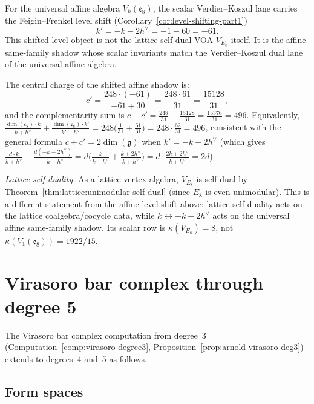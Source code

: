 \begin{computation}
\label{comp:E8-koszul-dual}
For the universal affine algebra $V_k(\mathfrak e_8)$, the scalar
Verdier--Koszul lane carries the Feigin--Frenkel level shift
(Corollary~\ref{cor:level-shifting-part1})
\[
k' = -k - 2h^\vee = -1 - 60 = -61.
\]
This shifted-level object is not the lattice self-dual VOA
$V_{E_8}$ itself. It is the affine same-family shadow whose scalar
invariants match the Verdier--Koszul dual lane of the universal
affine algebra.

The central charge of the shifted affine shadow is:
\[
c' = \frac{248 \cdot (-61)}{-61 + 30} = \frac{248 \cdot 61}{31} = \frac{15128}{31},
\]
and the complementarity sum is
$c + c' = \frac{248}{31} + \frac{15128}{31} = \frac{15376}{31} = 496$.
Equivalently,
$\frac{\dim(\mathfrak{e}_8) \cdot k}{k+h^\vee} +
\frac{\dim(\mathfrak{e}_8) \cdot k'}{k'+h^\vee}
= 248\bigl(\tfrac{1}{31} + \tfrac{61}{31}\bigr)
= 248 \cdot \tfrac{62}{31} = 496$,
consistent with the general formula
$c + c' = 2\dim(\mathfrak{g})$ when $k' = -k - 2h^\vee$
(which gives $\frac{d \cdot k}{k + h^\vee} + \frac{d(-k-2h^\vee)}{-k-h^\vee}
= d\bigl(\frac{k}{k+h^\vee} + \frac{k+2h^\vee}{k+h^\vee}\bigr)
= d \cdot \frac{2k + 2h^\vee}{k+h^\vee} = 2d$).

\emph{Lattice self-duality.}
As a lattice vertex algebra, $V_{E_8}$ is self-dual by
Theorem~\ref{thm:lattice:unimodular-self-dual} (since $E_8$ is
even unimodular). This is a different statement from the affine
level shift above: lattice self-duality acts on the lattice
coalgebra/cocycle data, while $k\leftrightarrow -k-2h^\vee$ acts on
the universal affine same-family shadow. Its scalar row is
$\kappa(V_{E_8})=8$, not $\kappa(V_1(\mathfrak e_8))=1922/15$.
\end{computation}


\section{Virasoro bar complex through degree 5}
\label{sec:virasoro-deg45}

The Virasoro bar complex computation from degree~3
(Computation~\ref{comp:virasoro-degree3}, Proposition~\ref{prop:arnold-virasoro-deg3})
extends to degrees~4 and~5 as follows.

\subsection{Form spaces}

